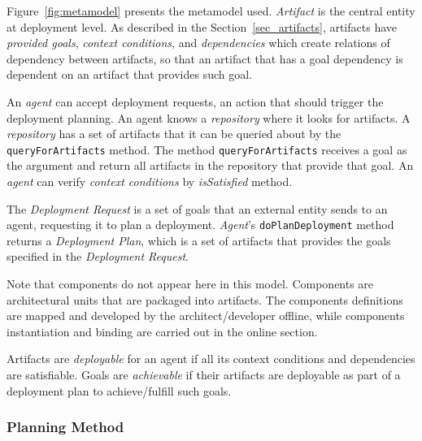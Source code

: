 Figure~\ref{fig:metamodel} presents the metamodel used. \emph{Artifact} is the central entity at deployment level. As described in the Section~\ref{sec_artifacts}, artifacts have \emph{provided goals}, \emph{context conditions}, and \emph{dependencies} which create relations of dependency between artifacts, so that an artifact that has a goal dependency is dependent on an artifact that provides such goal. %

An \emph{agent} can accept deployment requests, an action that should trigger the deployment planning. An agent knows a \emph{repository} where it looks for artifacts.
A \emph{repository} has a set of artifacts that it can be queried about by the \texttt{queryForArtifacts} method. The method \texttt{queryForArtifacts} receives a goal as the argument and return all artifacts in the repository that provide that goal. An \emph{agent} can verify \emph{context conditions} by \emph{isSatisfied} method.

The \emph{Deployment Request} is a set of goals that an external entity sends to an agent, requesting it to plan a deployment. \emph{Agent}’s \texttt{doPlanDeployment} method returns a \emph{Deployment Plan}, which is a set of  artifacts that provides the goals specified in the \emph{Deployment Request}.

Note that components do not appear here in this model. Components are architectural units that are packaged into artifacts. The components definitions are mapped and developed by the architect/developer offline, while components instantiation and binding are carried out in the online section.

Artifacts are \emph{deployable} for an agent if all its context conditions and dependencies are satisfiable.
Goals are \emph{achievable} if their artifacts are deployable as part of a deployment plan to achieve/fulfill such goals.


\subsubsection{Planning Method}
\label{sec:algorithm}

